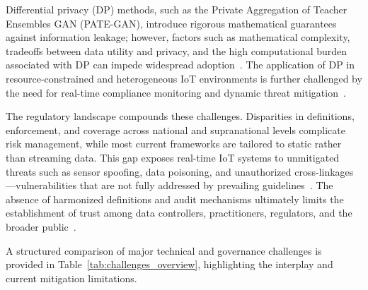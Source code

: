 \documentclass[11pt]{article}
\begin{document}
Differential privacy (DP) methods, such as the Private Aggregation of Teacher Ensembles GAN (PATE-GAN), introduce rigorous mathematical guarantees against information leakage; however, factors such as mathematical complexity, tradeoffs between data utility and privacy, and the high computational burden associated with DP can impede widespread adoption~\cite{ref91}. The application of DP in resource-constrained and heterogeneous IoT environments is further challenged by the need for real-time compliance monitoring and dynamic threat mitigation~\cite{ref2, ref4, ref5, ref6, ref7, ref8, ref9, ref10, ref24, ref25, ref28, ref30, ref31, ref33, ref34, ref35, ref36, ref41, ref43, ref46, ref50, ref54, ref51, ref61, ref62, ref63, ref64, ref65, ref70, ref71, ref72, ref75, ref76, ref77, ref78, ref79, ref82, ref83, ref84, ref90, ref91}.

The regulatory landscape compounds these challenges. Disparities in definitions, enforcement, and coverage across national and supranational levels complicate risk management, while most current frameworks are tailored to static rather than streaming data. This gap exposes real-time IoT systems to unmitigated threats such as sensor spoofing, data poisoning, and unauthorized cross-linkages—vulnerabilities that are not fully addressed by prevailing guidelines~\cite{ref4, ref5, ref10, ref24, ref25, ref30, ref31, ref33, ref34, ref35, ref36, ref41, ref43, ref46, ref50, ref54, ref61, ref62, ref63, ref64, ref65, ref76, ref77, ref82, ref83, ref84, ref91}. The absence of harmonized definitions and audit mechanisms ultimately limits the establishment of trust among data controllers, practitioners, regulators, and the broader public~\cite{ref91}.

A structured comparison of major technical and governance challenges is provided in Table~\ref{tab:challenges_overview}, highlighting the interplay and current mitigation limitations.
\end{document}
